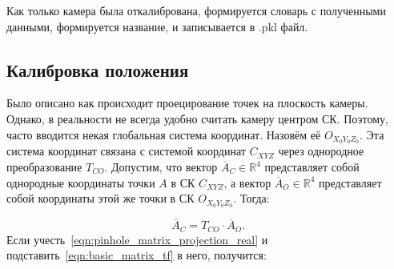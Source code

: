 \documentclass[14pt, a4paper]{extarticle}
\begin{document}
Как только камера была откалибрована, формируется словарь с полученными данными, формируется название, и записывается в .pkl файл.

    

\subsection{Калибровка положения}
\label{sec:position-calib}

Было описано как происходит проецирование точек на плоскость камеры. Однако, в
реальности не всегда удобно считать камеру центром СК. Поэтому, часто вводится
некая глобальная система координат. Назовём её $O_{X_0Y_0Z_0}$. Эта система
координат связана с системой координат $C_{XYZ}$ через однородное
преобразование $T_{CO}$. Допустим, что вектор $\overline{A}_C \in \mathbb{R}^4$
представляет собой однородные координаты точки $A$ в СК $C_{XYZ}$, а вектор
$\overline{A}_O \in \mathbb{R}^4$ представляет собой координаты этой же точки в
СК $O_{X_0Y_0Z_0}$. Тогда:

\begin{equation}
    \overline{A}_C = T_{CO} \cdot \overline{A}_O.
\label{eqn:basic_matrix_tf}
\end{equation}
Если учесть~\eqref{eqn:pinhole_matrix_projection_real} и
подставить~\eqref{eqn:basic_matrix_tf} в него, получится:
\end{document}
